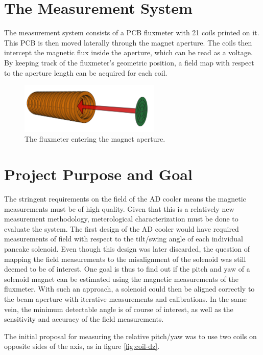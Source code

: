 \section{The Measurement System}
The measurement system consists of a PCB fluxmeter with 21 coils printed on it.
This PCB is then moved laterally through the magnet aperture.
The coils then intercept the magnetic flux inside the aperture,
which can be read as a voltage. By keeping track of the fluxmeter's
geometric position, a field map with respect to the aperture length
can be acquired for each coil.

\begin{figure}[!h]
    \centering
    \includegraphics[width=0.6\textwidth]{figs/pcbpath}
    \caption{The fluxmeter entering the magnet aperture.}
    \label{fig:pcbpath}
\end{figure}

\section{Project Purpose and Goal}
The stringent requirements on the field of the AD cooler means the
magnetic measurements must be of high quality. Given that this is
a relatively new measurement methodology, meterological characterization
must be done to evaluate the system. The first design of the AD cooler
would have required measurements of field with respect to the tilt/swing
angle of each individual pancake solenoid. Even though this design was
later discarded, the question of mapping the field measurements to
the misalignment of the solenoid was still deemed to be of interest.
One goal is thus to find out if the pitch and yaw of a solenoid magnet
can be estimated using the magnetic measurements of the fluxmeter.
With such an approach, a solenoid could then be aligned correctly
to the beam aperture with iterative measurements and calibrations.
In the same vein, the minimum detectable angle is of course of interest,
as well as the sensitivity and accuracy of the field measurements.

The initial proposal for measuring the relative pitch/yaw was to
use two coils on opposite sides of the axis, as in figure \ref{fig:coil-dz}.

